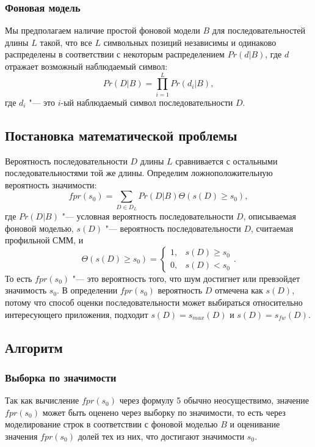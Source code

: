\documentclass[]{article}
\begin{document}
			\subsubsection{Фоновая модель}
			Мы предполагаем наличие простой фоновой модели $B$ для последовательностей длины $L$ такой, что все $L$ символьных позиций независимы и одинаково распределены в соответствии с некоторым распределением $Pr(d|B)$, где $d$ отражает возможный наблюдаемый символ:
			\begin{equation}
				Pr(D|B) = \prod_{i=1}^{L}Pr(d_{i}|B),
			\end{equation}
			где $d_{i}$ "--- это $i$-ый наблюдаемый символ последовательности $D$.
			
			\subsection{Постановка математической проблемы}
			Вероятность последовательности $D$ длины $L$ сравнивается с остальными последовательностями той же длины. Определим ложноположительную вероятность значимости:
			\begin{equation}
				fpr(s_{0}) =  \sum_{D \in D_{L}} Pr(D|B) \Theta(s(D) \geq s_{0}),
			\end{equation}
			где $Pr(D|B)$ "--- условная вероятность последовательности $D$, описываемая фоновой моделью, $s(D)$ "--- вероятность последовательности $D$, считаемая профильной СММ, и
			\[
				 \Theta(s(D) \geq s_{0}) = 
				 \begin{cases}
				 	1, & s(D) \geq s_{0}\\
				 	0, & s(D) < s_{0}
				 \end{cases}.
			\]
			То есть $fpr(s_{0})$ "--- это вероятность того, что шум достигнет или превзойдет значимость $s_{0}$. В определении $fpr(s_{0})$ вероятность $D$ отмечена как $s(D)$, потому что способ оценки последовательности может выбираться относительно интересующего приложения, подходит $s(D) = s_{max}(D)$ и $s(D) = s_{fw}(D)$.
			
			\subsection{Алгоритм}
			\subsubsection{Выборка по значимости}
			Так как вычисление $fpr(s_{0})$ через формулу 5 обычно неосуществимо, значение $fpr(s_{0})$ может быть оценено через выборку по значимости, то есть через моделирование строк в соответствии с фоновой моделью $B$ и оценивание значения $fpr(s_{0})$ долей тех из них, что достигают значимости $s_{0}$.
			
\end{document}
